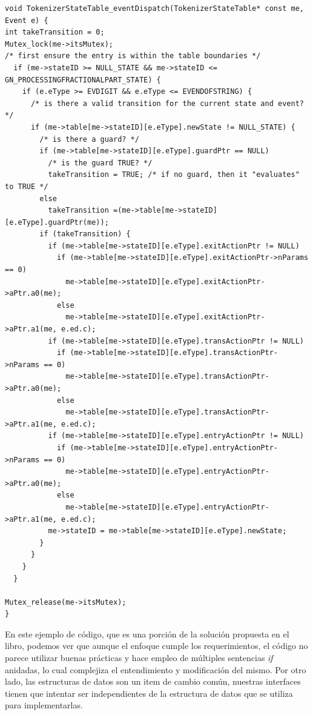 \begin{lstlisting}[caption=Código ejemplo Douglass State Table, label={ifsanidados}]
void TokenizerStateTable_eventDispatch(TokenizerStateTable* const me, Event e) {
int takeTransition = 0;
Mutex_lock(me->itsMutex);
/* first ensure the entry is within the table boundaries */
  if (me->stateID >= NULL_STATE && me->stateID <= GN_PROCESSINGFRACTIONALPART_STATE) {
    if (e.eType >= EVDIGIT && e.eType <= EVENDOFSTRING) {
      /* is there a valid transition for the current state and event? */
      if (me->table[me->stateID][e.eType].newState != NULL_STATE) {
        /* is there a guard? */
        if (me->table[me->stateID][e.eType].guardPtr == NULL)
          /* is the guard TRUE? */
          takeTransition = TRUE; /* if no guard, then it "evaluates" to TRUE */
        else
          takeTransition =(me->table[me->stateID][e.eType].guardPtr(me));
        if (takeTransition) {
          if (me->table[me->stateID][e.eType].exitActionPtr != NULL)
            if (me->table[me->stateID][e.eType].exitActionPtr->nParams == 0)
              me->table[me->stateID][e.eType].exitActionPtr->aPtr.a0(me);
            else
              me->table[me->stateID][e.eType].exitActionPtr->aPtr.a1(me, e.ed.c);
          if (me->table[me->stateID][e.eType].transActionPtr != NULL)
            if (me->table[me->stateID][e.eType].transActionPtr->nParams == 0)
              me->table[me->stateID][e.eType].transActionPtr->aPtr.a0(me);
            else
              me->table[me->stateID][e.eType].transActionPtr->aPtr.a1(me, e.ed.c);
          if (me->table[me->stateID][e.eType].entryActionPtr != NULL)
            if (me->table[me->stateID][e.eType].entryActionPtr->nParams == 0)
              me->table[me->stateID][e.eType].entryActionPtr->aPtr.a0(me);
            else
              me->table[me->stateID][e.eType].entryActionPtr->aPtr.a1(me, e.ed.c);
          me->stateID = me->table[me->stateID][e.eType].newState;
        }
      }
    }
  }

Mutex_release(me->itsMutex);
}
\end{lstlisting}

En este ejemplo de código, que es una porción de la solución propuesta en el libro, podemos ver que aunque el enfoque cumple los requerimientos, el código no parece utilizar buenas prácticas y hace empleo de múltiples sentencias \textit{if} anidadas, lo cual complejiza el entendimiento y modificación del mismo. Por otro lado, las estructuras de datos son un item de cambio común, nuestras interfaces tienen que intentar ser independientes de la estructura de datos que se utiliza para implementarlas.

